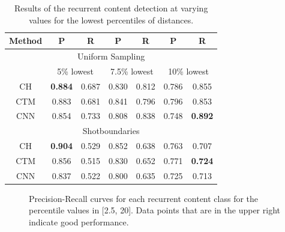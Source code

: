 \documentclass{article}
\begin{document}
\begin{table}[H]
	\begin{center}
		\begin{tabular}{ c c c c c c c} 
			\hline
			\textbf{Method} & \textbf{P} & \textbf{R} & \textbf{P} & \textbf{R} & \textbf{P} & \textbf{R} \\
			\hline
			\multicolumn{7}{c}{Uniform Sampling} \\
			 & \multicolumn{2}{c}{5\% lowest} & \multicolumn{2}{c}{7.5\% lowest} & \multicolumn{2}{c}{10\% lowest} \\
			\hline	
			CH 				& \textbf{0.884} 	& 0.687		& 0.830 	& 0.812 	& 0.786	 	& 0.855 \\
			CTM 			& 0.883 	& 0.681 		& 0.841 	& 0.796 & 0.796 	& 0.853 \\
			CNN 			& 0.854		& 0.733			& 0.808		& 0.838 & 0.748		& \textbf{0.892} \\
			\hline
			\multicolumn{7}{c}{Shotboundaries} \\
			\hline
			CH	 			& \textbf{0.904}		& 0.529 		& 0.852  	& 0.638 & 0.763	 	& 0.707 \\
			CTM 			& 0.856 	& 0.515 		& 0.830 	& 0.652 & 0.771		& \textbf{0.724} \\
			CNN 			& 0.837		& 0.522			& 0.800		& 0.635 & 0.725		& 0.713  \\
			\hline
		\end{tabular}
	\end{center}
	\caption{Results of the recurrent content detection at varying values for the lowest percentiles of distances.}
	\label{table:resultsrecurring}
\end{table}

\begin{figure}[h]
	\centering
	\caption{Precision-Recall curves for each recurrent content class for the percentile values in [2.5, 20]. Data points that are in the upper right indicate good performance.}
	\label{fig:precision-recall}
\end{figure}
\end{document}
